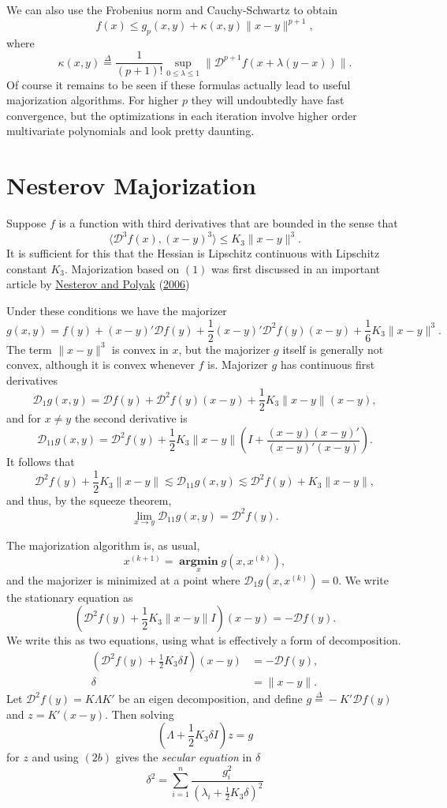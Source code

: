 \documentclass[
  12pt,
]{book}
\begin{document}
We can also use the Frobenius norm and Cauchy-Schwartz to obtain
\[
f(x)\leq g_p(x,y)+\kappa(x,y)\|x-y\|^{p+1},
\]
where
\[
\kappa(x,y)\mathop{=}\limits^{\Delta}\frac{1}{(p+1)!}\sup_{0\leq\lambda\leq 1}\|\mathcal{D}^{p+1}f(x+\lambda(y-x))\|.
\]
Of course it remains to be seen if these formulas actually lead to useful majorization algorithms. For higher \(p\) they will undoubtedly have fast convergence, but the optimizations in each iteration involve higher order multivariate polynomials and look pretty daunting.

\hypertarget{nesterov-majorization}{%
\section{Nesterov Majorization}\label{nesterov-majorization}}

Suppose \(f\) is a function with third derivatives that are bounded
in the sense that
\[
\langle\mathcal{D}^3f(x),(x-y)^3\rangle\leq K_3\|x-y\|^3.\tag{1}
\]
It is sufficient for this that the Hessian is Lipschitz continuous with Lipschitz constant \(K_3\). Majorization based on \((1)\) was first discussed in an important article by \protect\hyperlink{ref-nesterov_polyak_06}{Nesterov and Polyak} (\protect\hyperlink{ref-nesterov_polyak_06}{2006})

Under these conditions we have the majorizer
\[
g(x,y)=f(y)+(x-y)'\mathcal{D}f(y)+\frac12(x-y)'\mathcal{D}^2f(y)(x-y)+\frac16K_3\|x-y\|^3.
\]
The term \(\|x-y\|^3\) is convex in \(x\), but the majorizer \(g\) itself is generally not convex, although it is convex whenever \(f\) is. Majorizer \(g\) has continuous first derivatives
\[
\mathcal{D}_1g(x,y)=\mathcal{D}f(y)+\mathcal{D}^2f(y)(x-y)+\frac12K_3\|x-y\|(x-y),
\]
and for \(x\not= y\) the second derivative is
\[
\mathcal{D}_{11}g(x,y)=\mathcal{D}^2f(y)+\frac12K_3\|x-y\|\left(I+\frac{(x-y)(x-y)'}{(x-y)'(x-y)}\right).
\]
It follows that
\[
\mathcal{D}^2f(y)+\frac12K_3\|x-y\|\lesssim\mathcal{D}_{11}g(x,y)\lesssim\mathcal{D}^2f(y)+K_3\|x-y\|,
\]
and thus, by the squeeze theorem,
\[
\lim_{x\rightarrow y}\mathcal{D}_{11}g(x,y)=\mathcal{D}^2f(y).
\]

The majorization algorithm is, as usual,
\[
x^{(k+1)}=\mathop{\mathbf{argmin}}\limits_{x} g(x,x^{(k)}),
\]
and the majorizer is minimized at a point where \(\mathcal{D}_1g(x,x^{(k)})=0\). We write the stationary equation as
\[
\left(\mathcal{D}^2f(y)+\frac12K_3\|x-y\| I\right)(x-y)=-\mathcal{D}f(y).
\]
We write this as two equations, using what is effectively a form of decomposition.
\begin{align*}
\left(\mathcal{D}^2f(y)+\frac12K_3\delta I\right)(x-y)&=-\mathcal{D}f(y),\tag{2a}\\
\delta&=\|x-y\|.\tag{2b}
\end{align*}
Let \(\mathcal{D}^2f(y)=K\Lambda K'\) be an eigen decomposition, and
define \(g\mathop{=}\limits^{\Delta}-K'\mathcal{D}f(y)\) and \(z=K'(x-y)\). Then solving
\[
\left(\Lambda+\frac12K_3\delta I\right)z=g
\]
for \(z\) and using \((2b)\) gives the \emph{secular equation} in \(\delta\)
\[
\delta^2=\sum_{i=1}^n\frac{g_i^2}{(\lambda_i+\frac12 K_3\delta)^2}
\]
\end{document}

